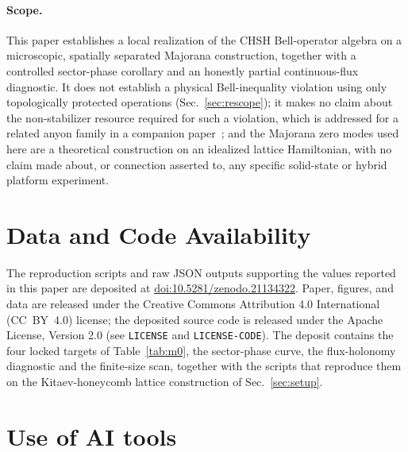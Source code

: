 \documentclass[aps,pra,twocolumn,superscriptaddress,floatfix,nofootinbib]{revtex4-2}
\begin{document}
\paragraph{Scope.} This paper establishes a local realization of the
CHSH Bell-operator algebra on a microscopic, spatially separated
Majorana construction, together with a controlled sector-phase
corollary and an honestly partial continuous-flux diagnostic. It does
not establish a physical Bell-inequality violation using only
topologically protected operations (Sec.~\ref{sec:rescope}); it makes
no claim about the non-stabilizer resource required for such a
violation, which is addressed for a related anyon family in a
companion paper~\cite{Sayim2026magic}; and the Majorana zero modes used
here are a theoretical construction on an idealized lattice
Hamiltonian, with no claim made about, or connection asserted to, any
specific solid-state or hybrid platform experiment.

\section*{Data and Code Availability}
The reproduction scripts and raw JSON outputs supporting the values
reported in this paper are deposited at
\href{https://doi.org/10.5281/zenodo.21134322}{doi:10.5281/zenodo.21134322}.
Paper, figures, and data are released under the Creative Commons
Attribution 4.0 International (CC~BY~4.0) license; the deposited source
code is released under the Apache License, Version 2.0
(see \texttt{LICENSE} and \texttt{LICENSE-CODE}).
The deposit contains the four locked targets of Table~\ref{tab:m0}, the
sector-phase curve, the flux-holonomy diagnostic and the finite-size
scan, together with the scripts that reproduce them on the
Kitaev-honeycomb lattice construction of Sec.~\ref{sec:setup}.

\section*{Use of AI tools}
\end{document}

